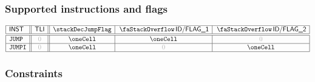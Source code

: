 \subsubsection{Supported instructions and flags}


\[
\begin{array}{|l||c||c|c|c|} \hline
	\INST        & \tli  & \stackDecJumpFlag & \decFlag{1} & \decFlag{2} \\ \hline\hline
	\inst{JUMP}  & \zero & \oneCell          & \oneCell    & \zero       \\ \hline
	\inst{JUMPI} & \zero & \oneCell          & \zero       & \oneCell    \\ \hline
\end{array}
\]


\subsubsection{Constraints}


\begin{center}
\end{center}

